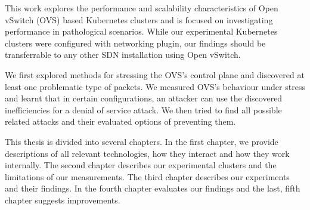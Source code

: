 This work explores the performance and scalability characteristics of Open vSwitch (OVS) based Kubernetes clusters and is focused on investigating performance in pathological scenarios. While our experimental Kubernetes clusters were configured with  networking plugin, our findings should be transferrable to any other SDN installation using Open vSwitch.

We first explored methods for stressing the OVS's control plane and discovered at least one problematic type of packets. We measured OVS's behaviour under stress and learnt that in certain configurations, an attacker can use the discovered inefficiencies for a denial of service attack. We then tried to find all possible related attacks and their evaluated options of preventing them. 

This thesis is divided into several chapters. In the first chapter, we provide descriptions of all relevant technologies, how they interact and how they work internally. The second chapter describes our experimental clusters and the limitations of our measurements. The third chapter describes our experiments and their findings. In the fourth chapter evaluates our findings and the last, fifth chapter suggests improvements. 



%
